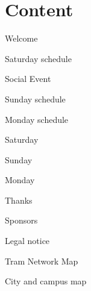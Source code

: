 \section*{Content}
\newlength\contentspace
\setlength\contentspace{\contentspace}

\vspace*{\contentspace}%
\noindent Welcome\dotfill \pageref{welcome}
%
%
%

\vspace*{\contentspace}%
\noindent Saturday schedule \dotfill \pageref{saturday}

\vspace*{\contentspace}%
\noindent Social Event \dotfill \pageref{social-event}

\vspace*{\contentspace}%
\noindent Sunday schedule \dotfill \pageref{sunday}

\vspace*{\contentspace}%
\noindent Monday schedule \dotfill \pageref{monday}

\vspace*{\contentspace}%
\noindent Saturday \dotfill \pageref{saturday-descriptions}

\vspace*{\contentspace}%
\noindent Sunday \dotfill \pageref{sunday-descriptions}

\vspace*{\contentspace}%
\noindent Monday \dotfill \pageref{monday-descriptions}

\vspace*{\contentspace}%
\noindent Thanks \dotfill \pageref{thanks}

\vspace*{\contentspace}%
\noindent Sponsors \dotfill \pageref{sponsors}

\vspace*{\contentspace}%
\noindent Legal notice \dotfill \pageref{legal}

\vspace*{\contentspace}%
\noindent Tram Network Map \dotfill \pageref{public-transport-map}

\vspace*{\contentspace}%
\noindent City and campus map \dotfill \pageref{maps}

